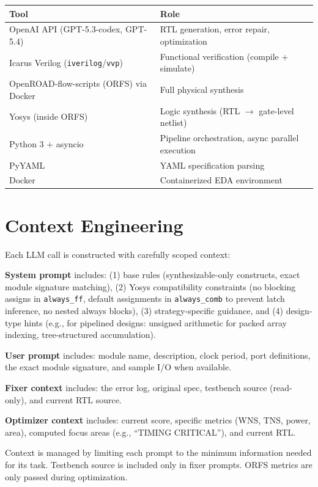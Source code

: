 \documentclass[10pt]{article}
\begin{document}
\begin{table}[h]
\centering
\small
\begin{tabularx}{\textwidth}{lX}
\toprule
\textbf{Tool} & \textbf{Role} \\
\midrule
OpenAI API (GPT-5.3-codex, GPT-5.4) & RTL generation, error repair, optimization \\
Icarus Verilog (\texttt{iverilog}/\texttt{vvp}) & Functional verification (compile + simulate) \\
OpenROAD-flow-scripts (ORFS) via Docker & Full physical synthesis \\
Yosys (inside ORFS) & Logic synthesis (RTL $\to$ gate-level netlist) \\
Python 3 + asyncio & Pipeline orchestration, async parallel execution \\
PyYAML & YAML specification parsing \\
Docker & Containerized EDA environment \\
\bottomrule
\end{tabularx}
\end{table}

\section{Context Engineering}

Each LLM call is constructed with carefully scoped context:

\textbf{System prompt} includes: (1) base rules (synthesizable-only constructs, exact module signature matching), 
(2) Yosys compatibility constraints (no blocking assigns in \texttt{always\_ff}, 
default assignments in \texttt{always\_comb} to prevent latch inference, no nested always blocks), 
(3) strategy-specific guidance, and (4) design-type hints 
(e.g., for pipelined designs: unsigned arithmetic for packed array indexing, tree-structured accumulation).

\textbf{User prompt} includes: module name, description, clock period, port definitions, 
the exact module signature, and sample I/O when available.

\textbf{Fixer context} includes: the error log, original spec, testbench source (read-only), and current RTL source.

\textbf{Optimizer context} includes: current score, specific metrics (WNS, TNS, power, area), 
computed focus areas (e.g., ``TIMING CRITICAL''), and current RTL.

Context is managed by limiting each prompt to the minimum information needed for its task. 
Testbench source is included only in fixer prompts. ORFS metrics are only passed during optimization.
\end{document}
